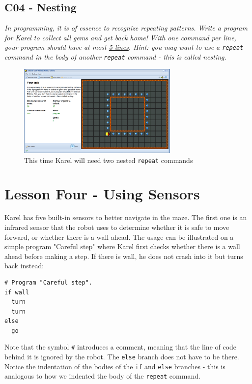 \documentclass[article,A4,12pt]{llncs}
\begin{document}
\newpage

\subsection{C04 - Nesting}

{\em In programming, it is of essence to recognize repeating patterns. 
Write a program for Karel to collect all gems and get back home! With 
one command per line, your program should have at most \underline{5 lines}.
Hint: you may want to use a {\tt repeat} command in the body of another
{\tt repeat} command - this is called {\em nesting}.}

\begin{figure}[!ht]
\begin{center}
\includegraphics[width=0.7\textwidth]{img/c04.png}
\end{center}
\vspace{-4mm}
\caption{This time Karel will need two nested {\tt repeat} commands}
\label{fig:c04}
\vspace{-4mm}
\end{figure}
\noindent



\section{Lesson Four - Using Sensors}

Karel has five built-in sensors to better navigate in the maze. 
The first one is an infrared sensor that the robot uses to determine 
whether it is safe to move forward, or whether there is a wall ahead.
The usage can be illustrated on a simple program "Careful step" 
where Karel first checks whether there is a wall ahead before
making a step. If there is wall, he does not crash into it but turns 
back instead: 

\begin{verbatim}
# Program "Careful step".
if wall
  turn
  turn
else
  go
\end{verbatim}
Note that the symbol {\tt \#} introduces a comment, meaning that the line 
of code behind it is ignored by the robot.
The {\tt else} branch does not have to be there. Notice the indentation 
of the bodies of the {\tt if} and {\tt else} branches - this is analogous 
to how we indented the body of the {\tt repeat} command.
\end{document}
